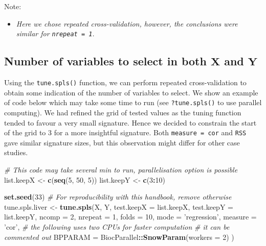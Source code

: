 \documentclass[]{book}
\newenvironment{Shaded}{\begin{snugshade}}{\end{snugshade}}
\newcommand{\KeywordTok}[1]{\textcolor[rgb]{0.13,0.29,0.53}{\textbf{#1}}}
\newcommand{\DataTypeTok}[1]{\textcolor[rgb]{0.13,0.29,0.53}{#1}}
\newcommand{\DecValTok}[1]{\textcolor[rgb]{0.00,0.00,0.81}{#1}}
\newcommand{\StringTok}[1]{\textcolor[rgb]{0.31,0.60,0.02}{#1}}
\newcommand{\CommentTok}[1]{\textcolor[rgb]{0.56,0.35,0.01}{\textit{#1}}}
\newcommand{\OperatorTok}[1]{\textcolor[rgb]{0.81,0.36,0.00}{\textbf{#1}}}
\newcommand{\NormalTok}[1]{#1}
\providecommand{\tightlist}{%
  \setlength{\itemsep}{0pt}\setlength{\parskip}{0pt}}
\begin{document}
Note:

\begin{itemize}
\tightlist
\item
  \emph{Here we chose repeated cross-validation, however, the
  conclusions were similar for \texttt{nrepeat\ =\ 1}.}
\end{itemize}

\subsection{\texorpdfstring{Number of variables to select in both
\(\boldsymbol X\) and
\(\boldsymbol Y\)}{Number of variables to select in both \textbackslash{}boldsymbol X and \textbackslash{}boldsymbol Y}}\label{number-of-variables-to-select-in-both-boldsymbol-x-and-boldsymbol-y}

Using the \texttt{tune.spls()} function, we can perform repeated
cross-validation to obtain some indication of the number of variables to
select. We show an example of code below which may take some time to run
(see \texttt{?tune.spls()} to use parallel computing). We had refined
the grid of tested values as the tuning function tended to favour a very
small signature. Hence we decided to constrain the start of the grid to
3 for a more insightful signature. Both
\texttt{measure\ =\ \textquotesingle{}cor\textquotesingle{}} and
\texttt{RSS} gave similar signature sizes, but this observation might
differ for other case studies.

\begin{Shaded}
\begin{Highlighting}[]
\CommentTok{# This code may take several min to run, parallelisation option is possible}
\NormalTok{list.keepX <-}\StringTok{ }\KeywordTok{c}\NormalTok{(}\KeywordTok{seq}\NormalTok{(}\DecValTok{5}\NormalTok{, }\DecValTok{50}\NormalTok{, }\DecValTok{5}\NormalTok{))}
\NormalTok{list.keepY <-}\StringTok{ }\KeywordTok{c}\NormalTok{(}\DecValTok{3}\OperatorTok{:}\DecValTok{10}\NormalTok{)}

\KeywordTok{set.seed}\NormalTok{(}\DecValTok{33}\NormalTok{)  }\CommentTok{# For reproducibility with this handbook, remove otherwise}
\NormalTok{tune.spls.liver <-}\StringTok{ }\KeywordTok{tune.spls}\NormalTok{(X, Y, }\DataTypeTok{test.keepX =}\NormalTok{ list.keepX, }
                             \DataTypeTok{test.keepY =}\NormalTok{ list.keepY, }\DataTypeTok{ncomp =} \DecValTok{2}\NormalTok{, }
                             \DataTypeTok{nrepeat =} \DecValTok{1}\NormalTok{, }\DataTypeTok{folds =} \DecValTok{10}\NormalTok{, }\DataTypeTok{mode =} \StringTok{'regression'}\NormalTok{, }
                             \DataTypeTok{measure =} \StringTok{'cor'}\NormalTok{, }
                            \CommentTok{#   the following uses two CPUs for faster computation}
                            \CommentTok{# it can be commented out}
                            \DataTypeTok{BPPARAM =}\NormalTok{ BiocParallel}\OperatorTok{::}\KeywordTok{SnowParam}\NormalTok{(}\DataTypeTok{workers =} \DecValTok{2}\NormalTok{)}
\NormalTok{                            )}
\end{Highlighting}
\end{Shaded}
\end{document}
